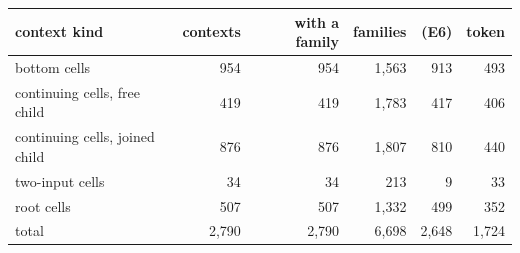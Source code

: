 \begin{tabular}{lrrrrr}
\toprule
context kind & contexts & with a family & families & (E6) & token \\
\midrule
bottom cells & 954 & 954 & 1{,}563 & 913 & 493 \\
continuing cells, free child & 419 & 419 & 1{,}783 & 417 & 406 \\
continuing cells, joined child & 876 & 876 & 1{,}807 & 810 & 440 \\
two-input cells & 34 & 34 & 213 & 9 & 33 \\
root cells & 507 & 507 & 1{,}332 & 499 & 352 \\
\midrule
total & 2{,}790 & 2{,}790 & 6{,}698 & 2{,}648 & 1{,}724 \\
\bottomrule
\end{tabular}
